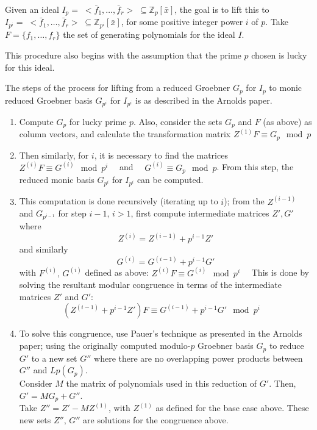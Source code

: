 \documentclass[letterpaper,12pt,titlepage,oneside,final]{book}
\begin{document}
Given an ideal ${I_{p} = \; <\bar f_1, \ldots, \bar f_r> \; \subseteq \mathbb{Z}_{p}[\bar x]}$, the goal is to lift this to ${I_{p^i} = \; <\bar f_1, \ldots, \bar f_r> \; \subseteq \mathbb{Z}_{p^i}[\bar x]}$, for some positive integer power ${i}$ of ${p}$.  Take ${F = \{f_1, \ldots, f_r\}}$ the set of generating polynomials for the ideal ${I}$.  

This procedure also begins with the assumption that the prime ${p}$ chosen is lucky for this ideal.

The steps of the process for lifting from a reduced Groebner ${G_p}$ for ${I_p}$ to monic reduced Groebner basis ${G_{p^i}}$ for ${I_{p^i}}$ is as described in the Arnolds paper.

\begin{enumerate}
  \item Compute ${G_p}$ for lucky prime ${p}$.  Also, consider the sets ${G_p}$ and ${F}$ (as above) as column vectors, and calculate the transformation matrix ${Z^{(1)}F \equiv G_p \mod p}$
  \item Then similarly, for ${i}$, it is necessary to find the matrices ${Z^{(i)}F \equiv G^{(i)} \mod p^i \quad}$ and ${\quad G^{(i)} \equiv G_p \mod p}$.  From this step, the reduced monic basis ${G_{p^i}}$ for ${I_{p^i}}$ can be computed.
  \item This computation is done recursively (iterating up to ${i}$); from the ${Z^{(i-1)}}$ and ${G_{p^{i-1}}}$ for step ${i-1,\, i > 1}$, first compute intermediate matrices ${Z', G'}$ where
  \begin{equation*}
    Z^{(i)} = Z^{(i-1)} + p^{i-1}Z'
  \end{equation*}
  and similarly
  \begin{equation*}
    G^{(i)} = G^{(i-1)} + p^{i-1}G'
  \end{equation*}
  with ${F^{(i)},\, G^{(i)}}$ defined as above: ${Z^{(i)}F \equiv G^{(i)} \mod p^i \quad}$
  This is done by solving the resultant modular congruence in terms of the intermediate matrices ${Z'}$ and ${G'}$:
  \begin{equation*}
    (Z^{(i-1)} + p^{i-1}Z')F \equiv G^{(i-1)} + p^{i-1}G'\mod p^i \quad
  \end{equation*}
  \item To solve this congruence, use Pauer's technique as presented in the Arnolds paper; using the originally computed modulo-${p}$ Groebner basis ${G_p}$ to reduce ${G'}$ to a new set ${G''}$ where there are no overlapping power products between ${G''}$ and ${Lp(G_p)}$.  \\ Consider ${M}$ the matrix of polynomials used in this reduction of ${G'}$.  Then, ${G' = MG_p + G''}$.\\ Take ${Z'' = Z' - MZ^{(1)}}$, with ${Z^{(1)}}$ as defined for the base case above.  These new sets ${Z'',\, G''}$ are solutions for the congruence above.

\end{enumerate}
\end{document}
